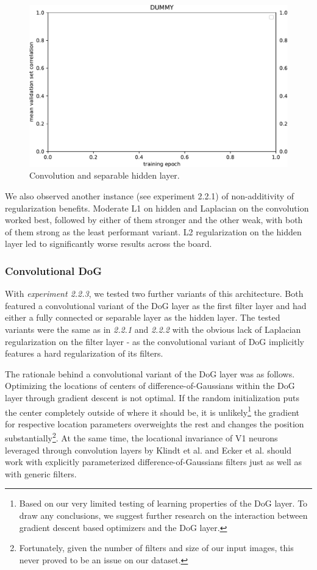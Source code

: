 \begin{figure}[H]
    \centering
    \includegraphics[width=1\textwidth]{../figures/05_dummy}
    \caption[Experiment 5.2.2.2]{Convolution and separable hidden layer.}
    \label{fig:5.2.2.2}
\end{figure}

We also observed another instance (see experiment 2.2.1) of non-additivity of regularization benefits. Moderate L1 on hidden and Laplacian on the convolution worked best, followed by either of them stronger and the other weak, with both of them strong as the least performant variant. L2 regularization on the hidden layer led to significantly worse results across the board.

\subsubsection{Convolutional DoG}

With \textit{experiment 2.2.3}, we tested two further variants of this architecture. Both featured a convolutional variant of the DoG layer as the first filter layer and had either a fully connected or separable layer as the hidden layer. The tested variants were the same as in \textit{2.2.1} and \textit{2.2.2} with the obvious lack of Laplacian regularization on the filter layer - as the convolutional variant of DoG implicitly features a hard regularization of its filters.

The rationale behind a convolutional variant of the DoG layer was as follows. Optimizing the locations of centers of difference-of-Gaussians within the DoG layer through gradient descent is not optimal. If the random initialization puts the center completely outside of where it should be, it is unlikely\footnote{Based on our very limited testing of learning properties of the DoG layer. To draw any conclusions, we suggest further research on the interaction between gradient descent based optimizers and the DoG layer.} the gradient for respective location parameters overweights the rest and changes the position substantially\footnote{Fortunately, given the number of filters and size of our input images, this never proved to be an issue on our dataset.}. At the same time, the locational invariance of V1 neurons leveraged through convolution layers by Klindt et al. and Ecker et al. should work with explicitly parameterized difference-of-Gaussians filters just as well as with generic filters.

